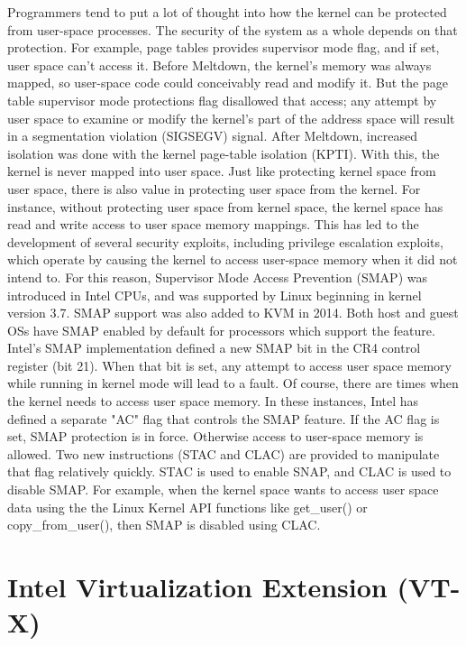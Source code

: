 \documentclass{report}
\begin{document}
\begin{spacing}{1.5}
{\large
Programmers tend to put a lot of thought into how the kernel can be protected from user-space processes. The security of the system as a whole depends on that protection. For example, page tables provides supervisor mode flag, and if set, user space can't access it. Before Meltdown, the kernel's memory was always mapped, so user-space code could conceivably read and modify it. But the page table supervisor mode protections flag disallowed that access; any attempt by user space to examine or modify the kernel's part of the address space will result in a segmentation violation (SIGSEGV) signal. After Meltdown, increased isolation was done with the kernel page-table isolation (KPTI). With this, the kernel is never mapped into user space. Just like protecting kernel space from user space, there is also value in protecting user space from the kernel. For instance, without protecting user space from kernel space, the kernel space has read and write access to user space memory mappings. This has led to the development of several security exploits, including privilege escalation exploits, which operate by causing the kernel to access user-space memory when it did not intend to. For this reason, Supervisor Mode Access Prevention (SMAP) was introduced in Intel CPUs, and was supported by Linux beginning in kernel version 3.7. SMAP support was also added to KVM in 2014. Both host and guest OSs have SMAP enabled by default for processors which support the feature. Intel's SMAP implementation defined a new SMAP bit in the CR4 control register (bit 21). When that bit is set, any attempt to access user space memory while running in kernel mode will lead to a fault. Of course, there are times when the kernel needs to access user space memory. In these instances, Intel has defined a separate "AC" flag that controls the SMAP feature. If the AC flag is set, SMAP protection is in force. Otherwise access to user-space memory is allowed. Two new instructions (STAC and CLAC) are provided to manipulate that flag relatively quickly. STAC is used to enable SNAP, and CLAC is used to disable SMAP. For example, when the kernel space wants to access user space data using the the Linux Kernel API functions like get\_user() or copy\_from\_user(), then SMAP is disabled using CLAC.
\newline
}



\section{Intel Virtualization Extension (VT-X)}


\end{spacing}
\end{document}

